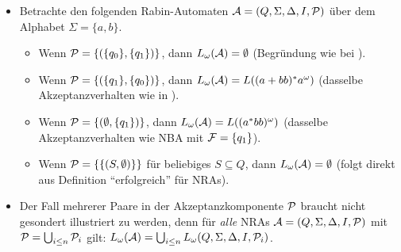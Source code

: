 \documentclass[fontsize=11pt, twoside=false, numbers=autoenddot]{scrbook}
\begin{document}
\begin{itemize}
  \item 
    Betrachte den folgenden Rabin-Automaten $\mathcal{A} = (Q,\Sigma,\Delta,I,\mathcal{P})$ über dem Alphabet $\Sigma = \{a,b\}$.
    \begin{center}
    \end{center}
    \begin{itemize}
      \item[\bspnr{(R1)}]
        Wenn $\mathcal{P} = \{(\{q_0\},\{q_1\})\}$, dann $L_\omega(\mathcal{A}) = \emptyset$ (Begründung wie bei ).
      \item[\bspnr{(R2)}]
        Wenn $\mathcal{P} = \{(\{q_1\},\{q_0\})\}$, dann $L_\omega(\mathcal{A}) = L((a+bb)^*a^\omega)$ (dasselbe Akzeptanzverhalten wie in ).
      \item[\bspnr{(R3)}]
        Wenn $\mathcal{P} = \{(\emptyset,\{q_1\})\}$, dann $L_\omega(\mathcal{A}) = L((a^*bb)^\omega)$ (dasselbe Akzeptanzverhalten wie NBA mit $\mathcal{F} = \{q_1\}$).
      \item[\bspnr{(R4)}]
        Wenn $\mathcal{P} = \{\{(S,\emptyset)\}\}$ für beliebiges $S \subseteq Q$, dann $L_\omega(\mathcal{A}) = \emptyset$ (folgt direkt aus Definition "`erfolgreich"' für NRAs).
    \end{itemize}
    \par\medskip    
  \item 
    Der Fall mehrerer Paare in der Akzeptanzkomponente $\mathcal{P}$ braucht nicht gesondert illustriert zu werden,
    denn für \emph{alle} NRAs $\mathcal{A} = (Q,\Sigma,\Delta,I,\mathcal{P})$ mit $\mathcal{P} = \bigcup_{i \leq n} \mathcal{P}_i$ gilt:
    $L_\omega(\mathcal{A}) = \bigcup_{i \leq n} L_\omega(Q,\Sigma,\Delta,I,\mathcal{P}_i)$.
\end{itemize}
\end{document}
